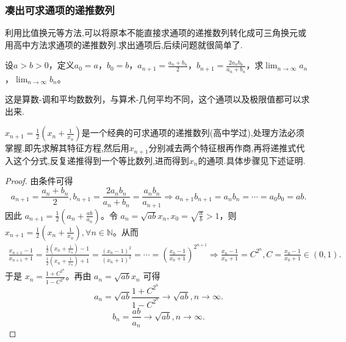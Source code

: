 \documentclass[../../main.tex]{subfiles}
\begin{document}
\subsubsection{凑出可求通项的递推数列}

利用比值换元等方法,可以将原本不能直接求通项的递推数列转化成可三角换元或用高中方法求通项的递推数列.求出通项后,后续问题就很简单了.

\begin{example}
设\(a > b>0\)，定义\(a_0 = a\)，\(b_0 = b\)，\(a_{n + 1}=\frac{a_n + b_n}{2}\)，\(b_{n + 1}=\frac{2a_nb_n}{a_n + b_n}\)，求\(\lim_{n\rightarrow\infty}a_n\)，\(\lim_{n\rightarrow\infty}b_n\)。
\end{example}
\begin{remark}
这是算数-调和平均数数列，与算术-几何平均不同，这个通项以及极限值都可以求出来.
\end{remark}\begin{note}
\(x_{n + 1}=\frac{1}{2}\left(x_n+\frac{1}{x_n}\right)\)是一个经典的可求通项的递推数列(高中学过),处理方法必须掌握.即先求解其特征方程,然后用$x_{n+1}$分别减去两个特征根再作商,再将递推式代入这个分式,反复递推得到一个等比数列,进而得到$x_n$的通项.具体步骤见下述证明.
\end{note}
\begin{proof}
由条件可得
\[
a_{n + 1}=\frac{a_n + b_n}{2},b_{n + 1}=\frac{2a_nb_n}{a_n + b_n}=\frac{a_nb_n}{a_{n + 1}}\Rightarrow a_{n + 1}b_{n + 1}=a_nb_n=\cdots =a_0b_0 = ab.
\]
因此 \(a_{n + 1}=\frac{1}{2}\left(a_n+\frac{ab}{a_n}\right)\)。令 \(a_n=\sqrt{ab}x_n,x_0=\sqrt{\frac{a}{b}}>1\)，则 \(x_{n + 1}=\frac{1}{2}\left(x_n+\frac{1}{x_n}\right),\forall n\in \mathbb{N}\)。从而
\begin{align*}
\frac{x_{n+1}-1}{x_{n+1}+1}=\frac{\frac{1}{2}\left( x_n+\frac{1}{x_n} \right) -1}{\frac{1}{2}\left( x_n+\frac{1}{x_n} \right) +1}=\frac{(x_n-1)^2}{(x_n+1)^2}=\cdots =\left( \frac{x_0-1}{x_0+1} \right) ^{2^{n+1}}\Rightarrow \frac{x_n-1}{x_n+1}=C^{2^n},C=\frac{x_0-1}{x_0+1}\in (0,1).
\end{align*}
于是 \(x_n=\frac{1 + C^{2^n}}{1 - C^{2^n}}\)。再由 \(a_n=\sqrt{ab}x_n\) 可得
\[
a_n=\sqrt{ab}\frac{1 + C^{2^n}}{1 - C^{2^n}}\rightarrow\sqrt{ab},n\rightarrow\infty.
\]
\[
b_n=\frac{ab}{a_n}\rightarrow\sqrt{ab},n\rightarrow\infty.
\]

\end{proof}
\end{document}
